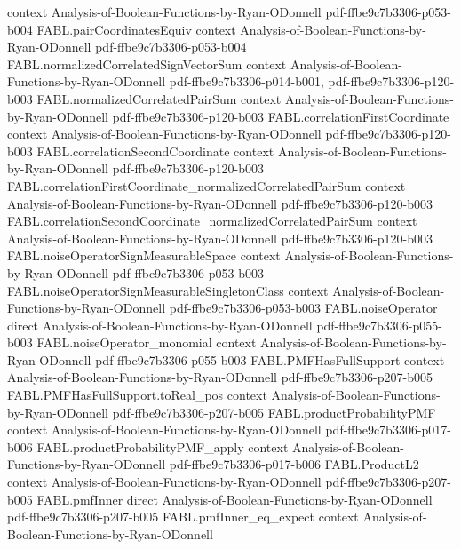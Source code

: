 \begin{theorem}
  {context}
  {Analysis-of-Boolean-Functions-by-Ryan-ODonnell}
  {pdf-ffbe9c7b3306-p053-b004}
\proofstep
  {FABL.pairCoordinatesEquiv}
  {context}
  {Analysis-of-Boolean-Functions-by-Ryan-ODonnell}
  {pdf-ffbe9c7b3306-p053-b004}
\proofstep
  {FABL.normalizedCorrelatedSignVectorSum}
  {context}
  {Analysis-of-Boolean-Functions-by-Ryan-ODonnell}
  {pdf-ffbe9c7b3306-p014-b001,
    pdf-ffbe9c7b3306-p120-b003}
\proofstep
  {FABL.normalizedCorrelatedPairSum}
  {context}
  {Analysis-of-Boolean-Functions-by-Ryan-ODonnell}
  {pdf-ffbe9c7b3306-p120-b003}
\proofstep
  {FABL.correlationFirstCoordinate}
  {context}
  {Analysis-of-Boolean-Functions-by-Ryan-ODonnell}
  {pdf-ffbe9c7b3306-p120-b003}
\proofstep
  {FABL.correlationSecondCoordinate}
  {context}
  {Analysis-of-Boolean-Functions-by-Ryan-ODonnell}
  {pdf-ffbe9c7b3306-p120-b003}
\proofstep
  {FABL.correlationFirstCoordinate_normalizedCorrelatedPairSum}
  {context}
  {Analysis-of-Boolean-Functions-by-Ryan-ODonnell}
  {pdf-ffbe9c7b3306-p120-b003}
\proofstep
  {FABL.correlationSecondCoordinate_normalizedCorrelatedPairSum}
  {context}
  {Analysis-of-Boolean-Functions-by-Ryan-ODonnell}
  {pdf-ffbe9c7b3306-p120-b003}
\proofstep
  {FABL.noiseOperatorSignMeasurableSpace}
  {context}
  {Analysis-of-Boolean-Functions-by-Ryan-ODonnell}
  {pdf-ffbe9c7b3306-p053-b003}
\proofstep
  {FABL.noiseOperatorSignMeasurableSingletonClass}
  {context}
  {Analysis-of-Boolean-Functions-by-Ryan-ODonnell}
  {pdf-ffbe9c7b3306-p053-b003}
\proofstep
  {FABL.noiseOperator}
  {direct}
  {Analysis-of-Boolean-Functions-by-Ryan-ODonnell}
  {pdf-ffbe9c7b3306-p055-b003}
\proofstep
  {FABL.noiseOperator_monomial}
  {context}
  {Analysis-of-Boolean-Functions-by-Ryan-ODonnell}
  {pdf-ffbe9c7b3306-p055-b003}
\proofstep
  {FABL.PMFHasFullSupport}
  {context}
  {Analysis-of-Boolean-Functions-by-Ryan-ODonnell}
  {pdf-ffbe9c7b3306-p207-b005}
\proofstep
  {FABL.PMFHasFullSupport.toReal_pos}
  {context}
  {Analysis-of-Boolean-Functions-by-Ryan-ODonnell}
  {pdf-ffbe9c7b3306-p207-b005}
\proofstep
  {FABL.productProbabilityPMF}
  {context}
  {Analysis-of-Boolean-Functions-by-Ryan-ODonnell}
  {pdf-ffbe9c7b3306-p017-b006}
\proofstep
  {FABL.productProbabilityPMF_apply}
  {context}
  {Analysis-of-Boolean-Functions-by-Ryan-ODonnell}
  {pdf-ffbe9c7b3306-p017-b006}
\proofstep
  {FABL.ProductL2}
  {context}
  {Analysis-of-Boolean-Functions-by-Ryan-ODonnell}
  {pdf-ffbe9c7b3306-p207-b005}
\proofstep
  {FABL.pmfInner}
  {direct}
  {Analysis-of-Boolean-Functions-by-Ryan-ODonnell}
  {pdf-ffbe9c7b3306-p207-b005}
\proofstep
  {FABL.pmfInner_eq_expect}
  {context}
  {Analysis-of-Boolean-Functions-by-Ryan-ODonnell}

\end{theorem}
